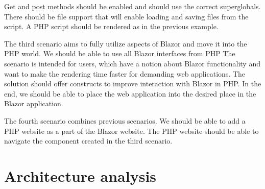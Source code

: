 Get and post methods should be enabled and should use the correct superglobals.
There should be file support that will enable loading and saving files from the script.
A PHP script should be rendered as in the previous example.
\par
The third scenario aims to fully utilize aspects of Blazor and move it into the PHP world.
We should be able to use all Blazor interfaces from PHP
The scenario is intended for users, which have a notion about Blazor functionality and want to make the rendering time faster for demanding web applications.
The solution should offer constructs to improve interaction with Blazor in PHP.
In the end, we should be able to place the web application into the desired place in the Blazor application.
\par
The fourth scenario combines previous scenarios.
We should be able to add a PHP website as a part of the Blazor website.
The PHP website should be able to navigate the component created in the third scenario.

\section{Architecture analysis}

